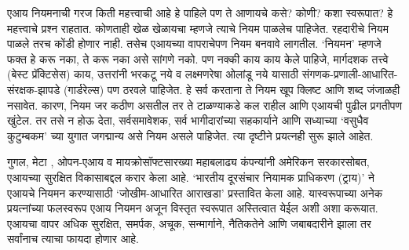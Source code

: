 एआय नियमनाची गरज किती महत्त्वाची आहे हे पाहिले पण ते आणायचे कसे? कोणी? कशा स्वरूपात? हे महत्त्वाचे  प्रश्न राहतात. कोणताही खेळ खेळायचा म्हणजे त्याचे नियम पाळलेच पाहिजेत. रहदारीचे नियम पाळले तरच कोंडी होणार नाही. तसेच एआयच्या वापराचेपण नियम बनवावे लागतील. `नियमन' म्हणजे फक्त हे करू नका, ते करू नका असे सांगणे नको. पण नक्की काय काय केले पाहिजे, मार्गदशक तत्त्वे  (बेस्ट प्रॅक्टिसेस) काय, उत्तरांनी भरकटू नये व लक्ष्मणरेषा ओलांडू नये यासाठी संगणक-प्रणाली-आधारित-संरक्षक-झापडे (गार्डरेल्स) पण ठरवले पाहिजेत. हे सर्व करताना ते नियम खूप क्लिष्ट आणि शब्द जंजाळही नसावेत. कारण, नियम जर कठीण असतील तर ते टाळण्याकडे कल राहील आणि एआयची पुढील प्रगतीपण खुंटेल. तर तसे न होऊ देता, सर्वसमावेशक, सर्व भागीदारांच्या सहकार्याने आणि सध्याच्या `वसुधैव कुटुम्बकम' च्या युगात जगद्मान्य असे नियम असले पाहिजेत. त्या दृष्टीने प्रयत्नही सुरू झाले आहेत.

गुगल, मेटा , ओपन-एआय व मायक्रोसॉफ्टसारख्या महाबलाढ्य कंपन्यांनी अमेरिकन सरकारसोबत, एआयच्या सुरक्षित विकासाबद्दल करार केला आहे. `भारतीय दूरसंचार नियामक प्राधिकरण (ट्राय)' ने एआयचे नियमन करण्यासाठी `जोखीम-आधारित आराखडा' प्रस्तावित केला आहे. यास्वरूपाच्या अनेक प्रयत्नांच्या फलस्वरूप एआय नियमन अजून विस्तृत स्वरूपात अस्तित्वात येईल अशी अशा करूयात. एआयचा वापर अधिक सुरक्षित, समर्पक, अचूक, सन्मार्गाने, नैतिकतेने आणि जबाबदारीने झाला तर सर्वांनाच त्याचा फायदा होणार आहे.
